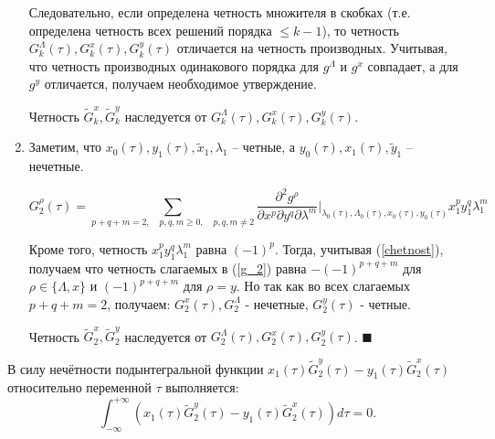 \begin{enumerate}
Следовательно, если определена четность множителя в скобках (т.е. определена четность всех решений порядка $\le k-1$), то четность $G_k^\Lambda(\tau),G_k^x(\tau),G_k^y(\tau)$ отличается на четность производных.
Учитывая, что четность производных одинакового порядка для $g^\Lambda$ и $g^x$ совпадает, а для $g^y$ отличается, получаем необходимое утверждение.

Четность $\tilde G_k^x, \tilde G_k^y$ наследуется от $G_k^\Lambda(\tau),G_k^x(\tau),G_k^y(\tau)$.

\item Заметим, что $x_0(\tau), y_1(\tau), \tilde x_1, \lambda_1$ -- четные, а $y_0(\tau), x_1(\tau), \tilde y_1$ -- нечетные.

\begin{equation}
G_2^\rho(\tau) = \sum_{p+q+m=2,\quad p,q,m \ge 0, \quad p,q,m \neq 2} \frac{\partial^{2}g^\rho}{\partial x^p \partial y^q \partial \lambda^m}\bigg|_{\lambda_0(\tau),\Lambda_0(\tau),x_0(\tau),y_0(\tau)} x_1^p y_1^q \lambda_1^m
\label{g_2}
\end{equation}

Кроме того, четность $x_1^p y_1^q \lambda_1^m$ равна $(-1)^p$. Тогда, учитывая (\ref{chetnost}), получаем что четность слагаемых в (\ref{g_2}) равна $-(-1)^{p+q+m}$ для $\rho \in \{ \Lambda, x \}$ и $(-1)^{p+q+m}$ для $\rho = y$. Но так как во всех слагаемых $p+q+m=2$, получаем:
$G_2^x(\tau), G_2^\Lambda$ - нечетные, $G_2^y(\tau)$ - четные.

Четность $\tilde G_2^x, \tilde G_2^y$ наследуется от $G_2^\Lambda(\tau),G_2^x(\tau),G_2^y(\tau)$.
$\blacksquare$
\end{enumerate}
\begin{consequence}
В силу нечётности подынтегральной функции $x_1(\tau) \tilde G_2^y(\tau) - y_1(\tau) \tilde G_2^x(\tau)$ относительно переменной $\tau$ выполняется:
$$\int_{-\infty}^{+\infty} \left( x_1(\tau) \tilde G_2^y(\tau) - y_1(\tau) \tilde G_2^x(\tau) \right) d \tau = 0.$$






\end{consequence}

